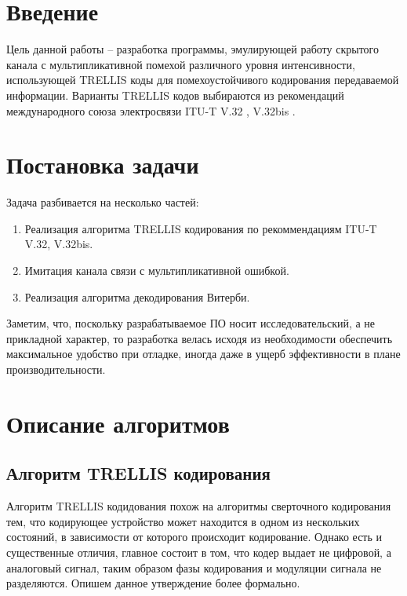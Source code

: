 \documentclass[a4paper,12pt]{article}
\begin{document}
\lstset{language=Java}

\section{Введение}

Цель данной работы – разработка программы, эмулирующей работу скрытого канала с мультипликативной помехой 
различного уровня интенсивности, использующей TRELLIS коды для помехоустойчивого кодирования передаваемой
информации. Варианты TRELLIS кодов выбираются из рекомендаций международного союза электросвязи 
ITU-T V.32 \cite{stV32}, V.32bis \cite{stV32bis}. 

\section{Постановка задачи}
Задача разбивается на несколько частей:

\begin{enumerate}
    \item Реализация алгоритма TRELLIS кодирования по рекоммендациям ITU-T V.32, V.32bis.
    \item Имитация канала связи с мультипликативной ошибкой.
    \item Реализация алгоритма декодирования Витерби.
\end{enumerate}

Заметим, что, поскольку разрабатываемое ПО носит исследовательский, а не прикладной характер, то разработка
велась исходя из необходимости обеспечить максимальное удобство при отладке, иногда даже в ущерб эффективности
в плане производительности.

\section{Описание алгоритмов}

\subsection{Алгоритм TRELLIS кодирования}
Алгоритм TRELLIS кодидования похож на алгоритмы сверточного кодирования тем, что кодирующее устройство может
находится в одном из нескольких состояний, в зависимости от которого происходит кодирование. Однако есть и
существенные отличия, главное состоит в том, что кодер выдает не цифровой, а аналоговый сигнал, таким образом
фазы кодирования и модуляции сигнала не разделяются.
Опишем данное утверждение более формально.
\end{document}

